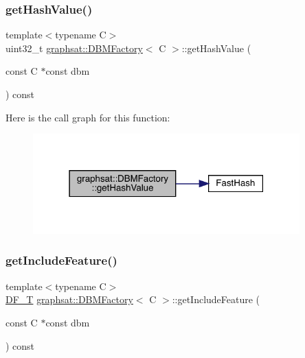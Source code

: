 \subsubsection{\texorpdfstring{getHashValue()}{getHashValue()}}
{\footnotesize\ttfamily template$<$typename C$>$ \\
uint32\+\_\+t \mbox{\hyperlink{classgraphsat_1_1_d_b_m_factory}{graphsat\+::\+D\+B\+M\+Factory}}$<$ C $>$\+::get\+Hash\+Value (\begin{DoxyParamCaption}\item[{const C $\ast$const}]{dbm }\end{DoxyParamCaption}) const\hspace{0.3cm}{\ttfamily [inline]}}

Here is the call graph for this function\+:
\nopagebreak
\begin{figure}[H]
\begin{center}
\leavevmode
\includegraphics[width=291pt]{classgraphsat_1_1_d_b_m_factory_ad2ff0a1517b24343a5d84af18d26bb59_cgraph}
\end{center}
\end{figure}
\mbox{\label{classgraphsat_1_1_d_b_m_factory_a7532cb7ca080144b870363fdd46ff23e}} 
\subsubsection{\texorpdfstring{getIncludeFeature()}{getIncludeFeature()}}
{\footnotesize\ttfamily template$<$typename C$>$ \\
\mbox{\hyperlink{namespacegraphsat_a9d75165dd4e82d2e03ffd07fe27533d0}{D\+F\+\_\+T}} \mbox{\hyperlink{classgraphsat_1_1_d_b_m_factory}{graphsat\+::\+D\+B\+M\+Factory}}$<$ C $>$\+::get\+Include\+Feature (\begin{DoxyParamCaption}\item[{const C $\ast$const}]{dbm }\end{DoxyParamCaption}) const\hspace{0.3cm}{\ttfamily [inline]}}

